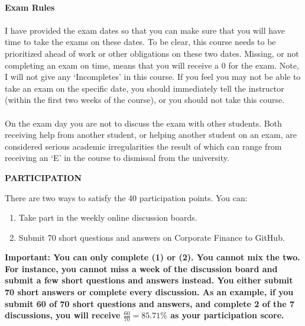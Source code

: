 \documentclass{article}
\begin{document}
\\
{\bf Exam Rules}\\
\\
I have provided the exam dates so that you can make sure that you will have time to take the exams on these dates. To be clear, this course needs to be prioritized ahead of work or other obligations on these two dates. Missing, or not completing an exam on time, means that you will receive a 0 for the exam.  Note, I will not give any `Incompletes' in this course.  If you feel you may not be able to take an exam on the specific date, you should immediately tell the instructor (within the first two weeks of the course), or you should not take this course. \\
\\
On the exam day you are not to discuss the exam with other students.  Both receiving help from another student, or helping another student on an exam, are considered serious academic irregularities the result of which can range from receiving an `E' in the course to dismissal from the university.\\

\begin{center}
{\bf PARTICIPATION}
\end{center}
There are two ways to satisfy the 40 participation points.  You can:
\begin{enumerate}
  \item Take part in the weekly online discussion boards.
  \item Submit 70 short questions and answers on Corporate Finance to GitHub.
\end{enumerate}
{\bf Important:  You can only complete (1) or (2).  You cannot mix the two.  For instance, you cannot miss a week of the discussion board and submit a few short questions and answers instead.  You either submit 70 short answers or complete every discussion.  As an example, if you submit 60 of 70 short questions and answers, and complete 2 of the 7 discussions, you will receive $\frac{60}{70} = 85.71\%$ as your participation score.}
\end{document}
